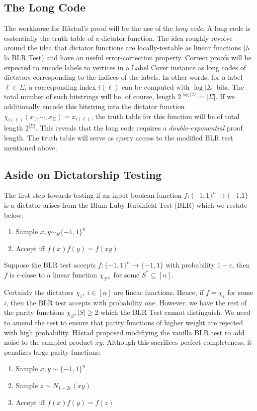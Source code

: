 \subsection{The Long Code}
The workhorse for H\aa stad's proof will be the use of the \emph{long code}. A long code is esstentially the truth table of a dictator function. The idea roughly revolve around the idea that dictator functions are locally-testable as linear functions (\`a la BLR Test) and have an useful error-correction property. Correct proofs will be expected to encode labels to vertices in a Label Cover instance as long codes of dictators corresponding to the indices of the labels. In other words, for a label $\ell \in \Sigma$, a corresponding index $i(\ell)$ can be computed with $\log{|\Sigma|}$ bits. The total number of such bitstrings will be, of course, length $2^{\log{|\Sigma|}} = |\Sigma|$. If we additionally encode this bitstring into the dictator function $\chi_{i(\ell)}(x_1,\cdots,x_{\Sigma}) = x_{i(\ell)}$, the truth table for this function will be of total length $2^{|\Sigma|}$. This reveals that the long code requires a \emph{double-exponential} proof length. The truth table will serve as query access to the modified BLR test mentioned above.


\subsection{Aside on Dictatorship Testing}
The first step towards testing if an input boolean function $f:\{-1,1\}^n \rightarrow \{-1.1\}$ is a dictator arises from the Blum-Luby-Rubinfeld Test (BLR) which we restate below: \newline

\begin{enumerate}
  \item Sample $x,y \sim_R \{-1,1\}^n$
  \item Accept iff $f(x)f(y) = f(xy)$
\end{enumerate}

\begin{theorem}
  Suppose the BLR test accepts $f:\{-1,1\}^n \rightarrow \{-1,1\}$ with probability $1 - \epsilon$, then $f$ is $\epsilon$-close to a linear function $\chi_{S*}$ for some $S^* \subseteq [n]$.
\end{theorem}
%
Certainly the dictators $\chi_i, \; i \in [n]$ are linear functions. Hence, if $f = \chi_i$ for some $i$, then the BLR test accepts with probability one. However, we have the rest of the parity functions $\chi_{S}, |S| \geq 2$ which the BLR Test cannot distinguish. We need to amend the test to ensure that parity functions of higher weight are rejected with high probability. H\aa stad proposed modifiying the vanilla BLR test to add noise to the sampled product $xy$. Although this sacrifices perfect completeness, it penalizes large parity functions: \newline
%
\begin{enumerate}
  \item Sample $x,y \sim \{-1,1\}^n$
  \item Sample $z \sim N_{1-2\epsilon}(xy)$
  \item Accept iff $f(x)f(y)=f(z)$
\end{enumerate}
%


